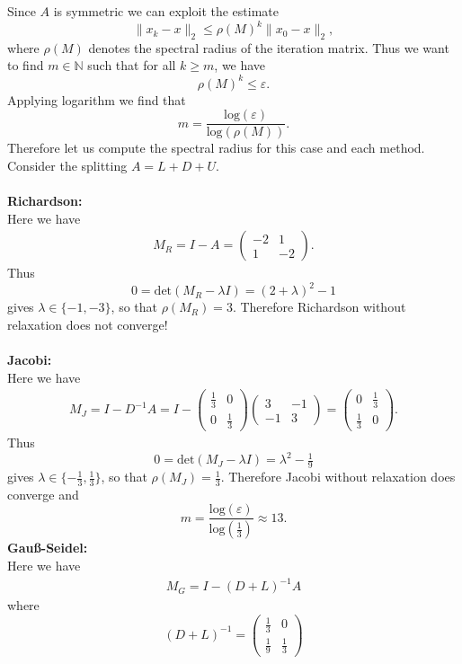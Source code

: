 {
\color{solution}
Since $A$ is symmetric we can exploit the estimate $$\|x_k-x\|_2 \leq \rho(M)^k\|x_0-x\|_2,$$ where $\rho(M)$ denotes the spectral radius of the iteration matrix.
Thus we want to find $m \in \mathbb{N}$ such that for all $k \geq m$, we have
$$\rho(M)^k \leq \varepsilon. $$
Applying logarithm we find that 
$$m =\frac{ \text{log}(\varepsilon)}{ \text{log}(\rho(M))}. $$
Therefore let us compute the spectral radius for this case and each method. Consider the splitting $A = L + D + U$.\\~\\
\textbf{Richardson:}\\
Here we have
\begin{align*}
	M_R = I - A = \begin{pmatrix}
		-2&1\\1&-2
	\end{pmatrix}.
\end{align*}
Thus 
$$0 = \text{det}( M_R-\lambda I) = (2+\lambda)^2 - 1 $$
gives $\lambda \in \{-1, -3\}$, so that $\rho(M_R) = 3$. Therefore Richardson without relaxation does not converge!\\~\\
\textbf{Jacobi:}\\
Here we have
\begin{align*}
	M_J = I - D^{-1}A 
	= I-\begin{pmatrix}
		\tfrac{1}{3}&0\\0&\tfrac{1}{3}
	\end{pmatrix}
	\begin{pmatrix}
		3&-1\\-1&3
	\end{pmatrix}
=
\begin{pmatrix}
	0&\tfrac{1}{3}\\\tfrac{1}{3}&0
\end{pmatrix}.
\end{align*}
Thus 
$$0 = \text{det}( M_J-\lambda I) = \lambda^2 - \tfrac{1}{9}$$
gives $\lambda \in \{-\tfrac{1}{3}, \tfrac{1}{3}\}$, so that $\rho(M_J) = \tfrac{1}{3}$. Therefore Jacobi without relaxation does converge and 
$$m =\frac{ \text{log}(\varepsilon)}{ \text{log}(\tfrac{1}{3})}\approx 13. $$
\textbf{Gauß-Seidel:}\\
Here we have
\begin{align*}
	M_G = I - (D+L)^{-1}A
\end{align*}
where 
$$(D+L)^{-1} = \begin{pmatrix}
\tfrac{1}{3}&0\\\tfrac{1}{9}&\tfrac{1}{3}

\end{pmatrix}$$}

